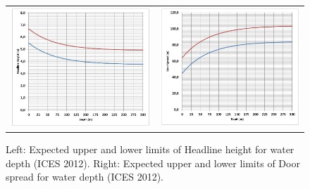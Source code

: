 \documentclass[a4paper 12pt]{article}
\numberwithin{equation}{section}
\begin{document}
\begin{figure}[h!]
\begin{tabular}{ll}
\includegraphics[scale=0.5]{headlineHeight.jpg}
&
\includegraphics[scale=0.5]{doorspead.jpg}
\end{tabular}
\caption{Left: Expected upper and lower limits of Headline height for water depth (ICES 2012). 
Right: Expected upper and lower limits of Door spread for water depth (ICES 2012).}
\label{fig:test}
\end{figure}
\end{document}
